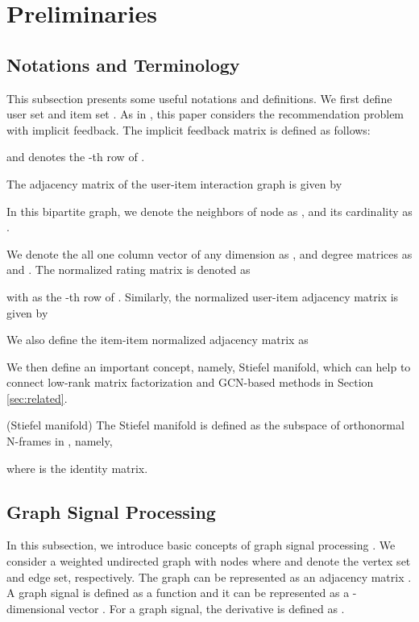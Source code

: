 \documentclass[sigconf]{acmart}
\begin{document}
\section{Preliminaries}
\label{sec:pre}
\subsection{Notations and Terminology}
This subsection presents some useful notations and definitions. We first define user set  and item set . As in \cite{he2020lightgcn}, this paper considers the recommendation problem with implicit feedback. The implicit feedback matrix  is defined as  follows:

and  denotes the -th row of .

The adjacency matrix of the user-item interaction graph is given by 

In this bipartite graph, we denote the neighbors of node  as , and its cardinality as .

We denote the all one column vector of any dimension as , and degree matrices as  and . The normalized rating matrix is denoted as 

with  as the -th row of . Similarly, the normalized user-item adjacency matrix is given by



We also define the item-item normalized adjacency matrix as 


We then define an important concept, namely, Stiefel manifold, which can help to connect low-rank matrix factorization and GCN-based methods in Section \ref{sec:related}.


\begin{definition} (Stiefel manifold) The Stiefel manifold  is defined as the subspace of orthonormal N-frames in , namely,

where  is the identity matrix.
\end{definition}
\subsection{Graph Signal Processing}
In this subsection, we introduce basic concepts of graph signal processing \cite{dong2020graph,ramakrishna2020user}. We consider a weighted undirected graph  with  nodes where  and  denote the vertex set and edge set, respectively. The graph can be represented as an adjacency matrix . A graph signal is defined as a function  and it can be represented as a -dimensional vector . For a graph signal, the derivative is defined as .
\end{document}
